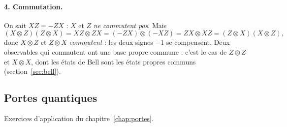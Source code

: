 \begin{correction}
\paragraph{4. Commutation.} On sait $XZ=-ZX$ : $X$ et $Z$ \emph{ne commutent pas}. Mais
\[
  (X\otimes Z)(Z\otimes X)=XZ\otimes ZX=(-ZX)\otimes(-XZ)=ZX\otimes XZ=(Z\otimes X)(X\otimes Z),
\]
donc $X\otimes Z$ et $Z\otimes X$ \emph{commutent} : les deux signes $-1$ se compensent. Deux
observables qui commutent ont une base propre commune : c'est le cas de $Z\otimes Z$ et $X\otimes X$, dont
les états de Bell sont les états propres communs (section~\ref{sec:bell}).
\end{correction}

\subsection{Portes quantiques}\label{sec:ex-portes}

Exercices d'application du chapitre~\ref{chap:portes}.

